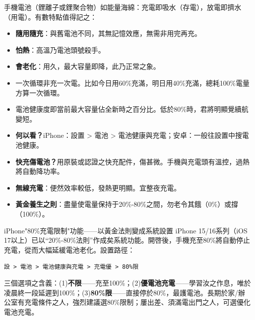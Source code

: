


手機電池（鋰離子或鋰聚合物）如能量海綿：充電即吸水（存電），放電即擠水（用電）。有數特點值得記之：

\begin{itemize}
  \item \textbf{隨用隨充}：與舊電池不同，其無記憶效應，無需非用完再充。
  \item \textbf{怕熱}：高溫乃電池頭號殺手。
  \item \textbf{會老化}：用久，最大容量即降，此乃正常之象。
\end{itemize}


\begin{itemize}
  \item 一次循環非充一次電。比如今日用60\%充滿，明日用40\%充滿，總耗100\%電量方算一次循環。
  \item 電池健康度即當前最大容量佔全新時之百分比。低於80\%時，君將明顯覺續航變短。
  \item \textbf{何以看？}iPhone：設置 > 電池 > 電池健康與充電；安卓：一般往設置中搜電池健康。
\end{itemize}


\begin{itemize}
  \item \textbf{快充傷電池？}用原裝或認證之快充配件，傷甚微。手機與充電頭有溫控，過熱將自動降功率。
  \item \textbf{無線充電}：便然效率較低，發熱更明顯。宜整夜充電。
  \item \textbf{黃金養生之則}：盡量使電量保持于20\%-80\%之間，勿老令其餓（0\%）或撐（100\%）。
\end{itemize}

\begin{tcbinfo}{iPhone"80\%充電限制"功能——以黃金法則變成系統設置}
iPhone 15/16系列（iOS 17以上）已以“20\%-80\%法則”作成矣系統功能。開啓後，手機充至80\%將自動停止充電，從而大幅延緩電池老化。設置路徑：

\texttt{設 > 電池 > 電池健康與充電 > 充電優 > 80\%限}

三個選項之含義：(1)\textbf{不限}——充至100\%；(2)\textbf{優電池充電}——學習汝之作息，唯於凌晨終一段延遲到100\%；(3)\textbf{80\%限}——直接停於80\%，最護電池。長期於家/辦公室有充電條件之人，強烈建議選80\%限制；屢出差、須滿電出門之人，可選優化電池充電。

\end{tcbinfo}

